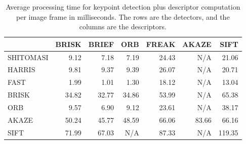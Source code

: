 \documentclass[a4paper]{scrartcl}
\begin{document}
\begin{table}
	\caption{Average processing time for keypoint detection plus descriptor computation
		per image frame in milliseconds.
		The rows are the detectors, and the columns are the descriptors.}
	\label{tab:performance_3}
	\begin{tabular}{l||r|r|r|r|r|r}
		 			& BRISK & BRIEF & ORB & FREAK 	& AKAZE & SIFT		\\
		\hline \hline
		SHITOMASI 	& 9.12	& 7.18	& 7.19	& 24.43	& N/A 	& 21.06 	\\
		HARRIS 		& 9.81	& 9.37	& 9.39	& 26.07	& N/A 	& 20.71 	\\
		FAST 		& 1.99	& 1.01	& 1.30	& 18.12	& N/A 	& 13.04 	\\
		BRISK 		& 34.82	& 32.77	& 34.86	& 53.99	& N/A 	& 65.38 	\\
		ORB 		& 9.57	& 6.90	& 9.12	& 23.61	& N/A 	& 38.17 	\\
		AKAZE 		& 50.24	& 45.77	& 48.59	& 66.06	& 83.66	& 66.16 	\\
		SIFT 		& 71.99	& 67.03	& N/A 	& 87.33	& N/A 	& 119.35 	\\
		\hline
	\end{tabular}
\end{table}
\end{document}
